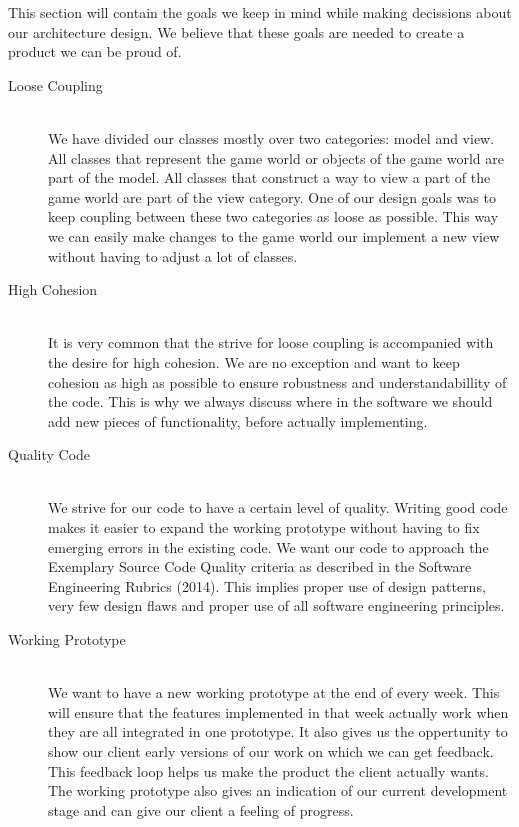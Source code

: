 This section will contain the goals we keep in mind while making decissions about our architecture design. We believe that these goals are needed to create a product we can be proud of.




\begin{description}

\item[Loose Coupling]  \hfill \\


We have divided our classes mostly over two categories: model and view. All classes that represent the game world or objects of the game world are part of the model. All classes that construct a way to view a part of the game world are part of the view category. One of our design goals was to keep coupling between these two categories as loose as possible. This way we can easily make changes to the game world our implement a new view without having to adjust a lot of classes.

\item[High Cohesion]  \hfill \\

It is very common that the strive for loose coupling is accompanied with the desire for high cohesion. We are no exception and want to keep cohesion as high as possible to ensure robustness and understandabillity of the code. This is why we always discuss  where in the software we should add new pieces of functionality, before actually implementing.

\item[Quality Code]  \hfill \\


We strive for our code to have a certain level of quality. Writing good code makes it easier to expand the working prototype without having to fix emerging errors in the existing code. We want our code to approach the Exemplary Source Code Quality criteria as described in the Software Engineering Rubrics (2014).  This implies proper use of design patterns, very few design flaws and proper use of all software engineering principles. 


\item[Working Prototype]  \hfill \\

We want to have a new working prototype at the end of every week. This will ensure that the features implemented in that week actually work when they are all integrated in one prototype. It also gives us the oppertunity to show our client early versions of our work on which we can get feedback. This feedback loop helps us make the product the client actually wants. The  working prototype also gives an indication of our current development stage and can give our client a feeling of progress.

\end{description}
